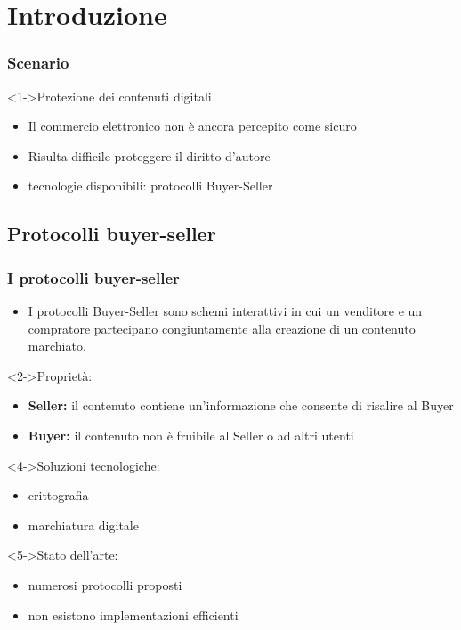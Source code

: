 \section{Introduzione}
\begin{frame}
 \frametitle{Scenario}
 \begin{center}\end{center}
   \begin{block}<1->{Protezione dei contenuti digitali}
    \begin{itemize}
     \item Il commercio elettronico non è ancora percepito come sicuro
     \item Risulta difficile proteggere il diritto d'autore
     \item tecnologie disponibili: protocolli Buyer-Seller
    \end{itemize}
   \end{block}
\end{frame}

\subsection{Protocolli buyer-seller}
\begin{frame}
 \frametitle{I protocolli buyer-seller}
 \begin{itemize}
 \item<1-> I protocolli Buyer-Seller sono schemi interattivi in cui un venditore e un compratore partecipano congiuntamente alla creazione di un contenuto marchiato.
\end{itemize}
\begin{block}<2->{Proprietà:}
 \begin{itemize}
 \item \textbf{Seller:} il contenuto contiene un'informazione che consente di risalire al Buyer
 \item<3-> \textbf{Buyer:} il contenuto non è fruibile al Seller o ad altri utenti 
 \end{itemize}
\end{block} 
 \begin{block}<4->{Soluzioni tecnologiche:}
 \begin{itemize}
 \item crittografia
 \item marchiatura digitale
 \end{itemize}
 \end{block}
\begin{block}<5->{Stato dell'arte:}
\begin{itemize}
\item numerosi protocolli proposti
\item non esistono implementazioni efficienti
\end{itemize}
 \end{block}

\end{frame}

